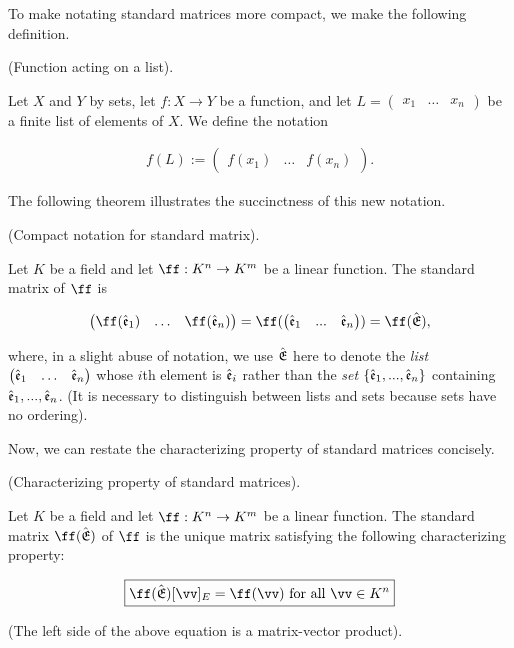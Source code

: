 To make notating standard matrices more compact, we make the following definition.

\begin{defn}
\label{ch::lin_alg::defn::linear_fn_acts_on_vectors}
    (Function acting on a list).
    
    Let $X$ and $Y$ by sets, let $f:X \rightarrow Y$ be a function, and let $L = \begin{pmatrix} x_1 & \hdots & x_n \end{pmatrix}$ be a finite list of elements of $X$. We define the notation
    
    \begin{align*}
        f(L) := \begin{pmatrix} f(x_1) & \hdots & f(x_n) \end{pmatrix}.
    \end{align*}
\end{defn}

The following theorem illustrates the succinctness of this new notation.

\begin{theorem}
    (Compact notation for standard matrix).
    
    Let $K$ be a field and let $\ff:K^n \rightarrow K^m$ be a linear function. The standard matrix of $\ff$ is
    
    \begin{align*}
        \begin{pmatrix} \ff(\see_1) & \hdots & \ff(\see_n) \end{pmatrix} = \ff(\begin{pmatrix} \see_1 & ... & \see_n \end{pmatrix}) = \ff(\sE),
    \end{align*}
    
    where, in a slight abuse of notation, we use ${\hat{\mathfrak{E}}}$ here to denote the \textit{list} $\begin{pmatrix} \hat{\mathfrak{e}}_1 & \hdots & \hat{\mathfrak{e}}_n \end{pmatrix}$ whose $i$th element is $\hat{\mathfrak{e}}_i$ rather than the \textit{set} $\{\hat{\mathfrak{e}}_1, ..., \hat{\mathfrak{e}}_n\}$ containing $\hat{\mathfrak{e}}_1, ..., \hat{\mathfrak{e}}_n$. (It is necessary to distinguish between lists and sets because sets have no ordering).
\end{theorem}

Now, we can restate the characterizing property of standard matrices concisely.

\begin{theorem}
    (Characterizing property of standard matrices).
    \label{ch::lin_alg::thm::characterizing_property_of_standard_matrix}
    
    Let $K$ be a field and let $\ff:K^n \rightarrow K^m$ be a linear function. The standard matrix $\ff(\sE)$ of $\ff$ is the unique matrix satisfying the following characterizing property:
    
    \begin{align*}
        \boxed{
            \ff(\sE) [\vv]_E = \ff(\vv) \text{ for all $\vv \in K^n$}
        }
    \end{align*}
    
    (The left side of the above equation is a matrix-vector product).
\end{theorem}

